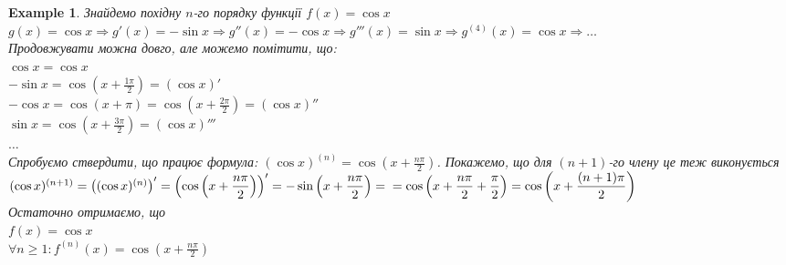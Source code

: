 \documentclass[a4paper, 14pt]{extarticle}
\def\huge{\displaystyle}
\theoremstyle{theoremdd}
\theoremstyle{theoremdd}
\theoremstyle{theoremdd}
\theoremstyle{theoremdd}
\newtheorem{example}[theorem]{Example}
\theoremstyle{theoremdd}
\theoremstyle{theoremdd}
\theoremstyle{theoremdd}
\theoremstyle{theoremdd}
\begin{document}
\begin{example}
Знайдемо похідну $n$-го порядку функції $f(x) = \cos x$\\
$g(x) = \cos x \Rightarrow g'(x) = -\sin x \Rightarrow g''(x) = -\cos x \Rightarrow g'''(x) = \sin x \Rightarrow g^{(4)}(x) = \cos x \Rightarrow \dots$\\
Продовжувати можна довго, але можемо помітити, що:\\
$\cos x = \cos x$\\
$- \sin x = \huge \cos \left(x + \frac{1\pi}{2} \right) = (\cos x)'$\\
$- \cos x = \huge \cos \left(x + \pi \right) = \cos \left(x + \frac{2 \pi}{2} \right) = (\cos x)''$\\
$ \sin x = \huge \cos \left(x + \frac{3\pi}{2} \right) = (\cos x)'''$\\
$\dots$\\
Спробуємо ствердити, що працює формула: $(\cos x)^{(n)} = \huge \cos \left(x + \frac{n\pi}{2} \right)$. Покажемо, що для $(n+1)$-го члену це теж виконується\\
$(\cos x)^{(n+1)} = \left((\cos x)^{(n)}\right)' = \huge \left( \cos \left(x + \frac{n\pi}{2} \right) \right)' = -\sin \left(x + \frac{n\pi}{2} \right) = \\ = \cos \left(x + \frac{n\pi}{2} + \frac{\pi}{2} \right) = \cos \left(x + \frac{(n+1)\pi}{2} \right)$\\
Остаточно отримаємо, що\\
$f(x) = \cos x$\\
$\forall n \geq 1: f^{(n)}(x) = \huge \cos \left(x + \frac{n\pi}{2} \right)$
\end{example}
\end{document}

